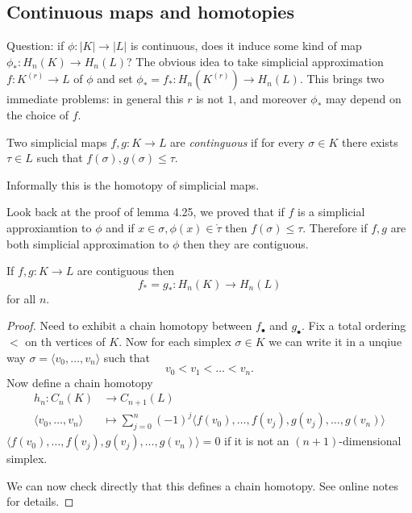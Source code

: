 \documentclass[a4paper]{article}
\newcommand{\interior}{\mathring} %
\begin{document}
\subsection{Continuous maps and homotopies}

Question: if \(\phi: |K| \to |L|\) is continuous, does it induce some kind of map \(\phi_*: H_n(K) \to H_n(L)\)? The obvious idea to take simplicial approximation \(f: K^{(r)} \to L\) of \(\phi\) and set \(\phi_* = f_*: H_n(K^{(r)}) \to H_n(L)\). This brings two immediate problems: in general this \(r\) is not \(1\), and moreover \(\phi_*\) may depend on the choice of \(f\).

\begin{definition}[continguous]
  Two simplicial maps \(f, g: K \to L\) are \emph{continguous} if for every \(\sigma \in K\) there exists \(\tau \in L\) such that \(f(\sigma), g(\sigma) \leq \tau\).
\end{definition}

Informally this is the homotopy of simplicial maps.

\begin{remark}
  Look back at the proof of lemma 4.25, we proved that if \(f\) is a simplicial approxiamtion to \(\phi\) and if \(x \in \sigma, \phi(x) \in \interior \tau\) then \(f(\sigma) \leq \tau\). Therefore if \(f, g\) are both simplicial approximation to \(\phi\) then they are contiguous.
\end{remark}

\begin{lemma}
  If \(f, g: K \to L\) are contiguous then
  \[
    f_* = g_*: H_n(K) \to H_n(L)
  \]
  for all \(n\).
\end{lemma}

\begin{proof}
  Need to exhibit a chain homotopy between \(f_\bullet\) and \(g_\bullet\). Fix a total ordering \(<\) on th vertices of \(K\). Now for each simplex \(\sigma \in K\) we can write it in a unqiue way \(\sigma = \langle v_0, \dots, v_n \rangle\) such that
  \[
    v_0 < v_1 < \dots < v_n.
  \]
  Now define a chain homotopy
  \begin{align*}
    h_n: C_n(K) &\to C_{n + 1}(L) \\
    \langle v_0, \dots, v_n \rangle &\mapsto \sum_{j = 0}^n (-1)^j \langle f(v_0), \dots, f(v_j), g(v_j), \dots, g(v_n) \rangle
  \end{align*}
  \(\langle f(v_0), \dots, f(v_j), g(v_j), \dots, g(v_n) \rangle = 0\) if it is not an \((n + 1)\)-dimensional simplex.

  We can now check directly that this defines a chain homotopy. See online notes for details.
\end{proof}
\end{document}
